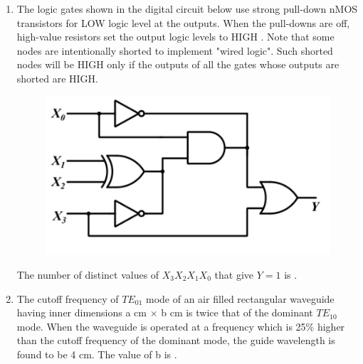 \documentclass[a4paper, 11pt]{article}
\begin{document}
\begin{enumerate}
    \hfill{}

    \item The logic gates shown in the digital circuit below use strong pull-down nMOS transistors for LOW logic level at the outputs. When the pull-downs are off, high-value resistors set the output logic levels to HIGH . Note that some nodes are intentionally shorted to implement "wired logic". Such shorted nodes will be HIGH only if the outputs of all the gates whose outputs are shorted are HIGH.
    \begin{figure}[H]
        \centering
        \includegraphics[width=0.6\columnwidth]{figs/q47.png}
        \caption*{}
        \label{fig:q47}
    \end{figure}
    The number of distinct values of $X_3X_2X_1X_0$  that give $Y=1$ is \underline{\hspace{2cm}}.
    
    \hfill{}

    \item The cutoff frequency of $TE_{01}$ mode of an air filled rectangular waveguide having inner dimensions a cm $\times$ b cm  is twice that of the dominant $TE_{10}$ mode. When the waveguide is operated at a frequency which is 25\% higher than the cutoff frequency of the dominant mode, the guide wavelength is found to be 4 cm. The value of b  is \underline{\hspace{2cm}}.
    
    \hfill{}


\end{enumerate}
\end{document}
